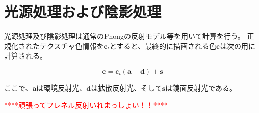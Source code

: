 \section{光源処理および陰影処理}
\label{SPhongandshade}

光源処理及び陰影処理は通常のPhongの反射モデル等を用いて計算を行う。
正規化されたテクスチャ色情報を$\bm{c}_t$とすると、最終的に描画される色$\bm{c}$は次の用に計算される。

\begin{equation}
\label{EColor}
\bm{c} = \bm{c}_t(\bm{a} + \bm{d}) + \bm{s}
\end{equation}

ここで、$\bm{a}$は環境反射光、$\bm{d}$は拡散反射光、そして$\bm{s}$は鏡面反射光である。


\textcolor{red}{****頑張ってフレネル反射いれまっしょい！！****}

